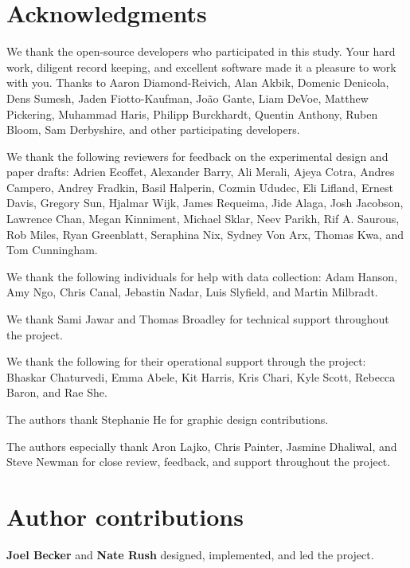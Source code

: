 \documentclass{article}
\begin{document}
\section{Acknowledgments}


We thank the open-source developers who participated in this study. Your hard work, diligent record keeping, and excellent software made it a pleasure to work with you. Thanks to Aaron Diamond-Reivich, Alan Akbik, Domenic Denicola, Dens Sumesh, Jaden Fiotto-Kaufman, João Gante, Liam DeVoe, Matthew Pickering, Muhammad Haris, Philipp Burckhardt, Quentin Anthony, Ruben Bloom, Sam Derbyshire, and other participating developers.

We thank the following reviewers for feedback on the experimental design and paper drafts: Adrien Ecoffet, Alexander Barry, Ali Merali, Ajeya Cotra, Andres Campero, Andrey Fradkin, Basil Halperin, Cozmin Ududec, Eli Lifland, Ernest Davis, Gregory Sun, Hjalmar Wijk, James Requeima, Jide Alaga, Josh Jacobson, Lawrence Chan, Megan Kinniment, Michael Sklar, Neev Parikh, Rif A. Saurous, Rob Miles, Ryan Greenblatt, Seraphina Nix, Sydney Von Arx, Thomas Kwa, and Tom Cunningham.

We thank the following individuals for help with data collection: Adam Hanson, Amy Ngo, Chris Canal, Jebastin Nadar, Luis Slyfield, and Martin Milbradt.

We thank Sami Jawar and Thomas Broadley for technical support throughout the project.

We thank the following for their operational support through the project: Bhaskar Chaturvedi, Emma Abele, Kit Harris, Kris Chari, Kyle Scott, Rebecca Baron, and Rae She.

The authors thank Stephanie He for graphic design contributions.

The authors especially thank Aron Lajko, Chris Painter, Jasmine Dhaliwal, and Steve Newman for close review, feedback, and support throughout the project.

\newpage 




\newpage
\appendix


\section{Author contributions}


\textbf{Joel Becker} and \textbf{Nate Rush} designed, implemented, and led the project.
\end{document}
